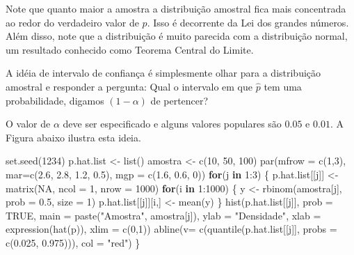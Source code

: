\documentclass[
  10pt,
  a4paper]{book}
\newenvironment{Shaded}{\begin{snugshade}}{\end{snugshade}}
\newcommand{\AttributeTok}[1]{\textcolor[rgb]{0.77,0.63,0.00}{#1}}
\newcommand{\ConstantTok}[1]{\textcolor[rgb]{0.00,0.00,0.00}{#1}}
\newcommand{\ControlFlowTok}[1]{\textcolor[rgb]{0.13,0.29,0.53}{\textbf{#1}}}
\newcommand{\DecValTok}[1]{\textcolor[rgb]{0.00,0.00,0.81}{#1}}
\newcommand{\FloatTok}[1]{\textcolor[rgb]{0.00,0.00,0.81}{#1}}
\newcommand{\FunctionTok}[1]{\textcolor[rgb]{0.00,0.00,0.00}{#1}}
\newcommand{\NormalTok}[1]{#1}
\newcommand{\OtherTok}[1]{\textcolor[rgb]{0.56,0.35,0.01}{#1}}
\newcommand{\SpecialCharTok}[1]{\textcolor[rgb]{0.00,0.00,0.00}{#1}}
\newcommand{\StringTok}[1]{\textcolor[rgb]{0.31,0.60,0.02}{#1}}
\begin{document}
Note que quanto maior a amostra a distribuição amostral fica mais concentrada ao redor do verdadeiro valor de \(p\). Isso é decorrente da Lei dos grandes números. Além disso, note que a distribuição é muito parecida com a distribuição normal, um resultado conhecido como Teorema Central do Limite.

A idéia de intervalo de confiança é simplesmente olhar para a distribuição amostral e responder a pergunta: Qual o intervalo em que \(\hat{p}\) tem uma probabilidade, digamos \((1-\alpha)\) de pertencer?

O valor de \(\alpha\) deve ser especificado e alguns valores populares são \(0.05\) e \(0.01\).
A Figura abaixo ilustra esta ideia.

\begin{Shaded}
\begin{Highlighting}[]
\FunctionTok{set.seed}\NormalTok{(}\DecValTok{1234}\NormalTok{)}
\NormalTok{p.hat.list }\OtherTok{\textless{}{-}} \FunctionTok{list}\NormalTok{()}
\NormalTok{amostra }\OtherTok{\textless{}{-}} \FunctionTok{c}\NormalTok{(}\DecValTok{10}\NormalTok{, }\DecValTok{50}\NormalTok{, }\DecValTok{100}\NormalTok{)}
\FunctionTok{par}\NormalTok{(}\AttributeTok{mfrow =} \FunctionTok{c}\NormalTok{(}\DecValTok{1}\NormalTok{,}\DecValTok{3}\NormalTok{), }\AttributeTok{mar=}\FunctionTok{c}\NormalTok{(}\FloatTok{2.6}\NormalTok{, }\FloatTok{2.8}\NormalTok{, }\FloatTok{1.2}\NormalTok{, }\FloatTok{0.5}\NormalTok{), }\AttributeTok{mgp =} \FunctionTok{c}\NormalTok{(}\FloatTok{1.6}\NormalTok{, }\FloatTok{0.6}\NormalTok{, }\DecValTok{0}\NormalTok{))}
\ControlFlowTok{for}\NormalTok{(j }\ControlFlowTok{in} \DecValTok{1}\SpecialCharTok{:}\DecValTok{3}\NormalTok{) \{}
\NormalTok{  p.hat.list[[j]] }\OtherTok{\textless{}{-}} \FunctionTok{matrix}\NormalTok{(}\ConstantTok{NA}\NormalTok{, }\AttributeTok{ncol =} \DecValTok{1}\NormalTok{, }\AttributeTok{nrow =} \DecValTok{1000}\NormalTok{)}
  \ControlFlowTok{for}\NormalTok{(i }\ControlFlowTok{in} \DecValTok{1}\SpecialCharTok{:}\DecValTok{1000}\NormalTok{) \{}
\NormalTok{  y }\OtherTok{\textless{}{-}} \FunctionTok{rbinom}\NormalTok{(amostra[j], }\AttributeTok{prob =} \FloatTok{0.5}\NormalTok{, }\AttributeTok{size =} \DecValTok{1}\NormalTok{)}
\NormalTok{  p.hat.list[[j]][i,] }\OtherTok{\textless{}{-}} \FunctionTok{mean}\NormalTok{(y)}
\NormalTok{  \}}
\FunctionTok{hist}\NormalTok{(p.hat.list[[j]], }\AttributeTok{prob =} \ConstantTok{TRUE}\NormalTok{, }\AttributeTok{main =} \FunctionTok{paste}\NormalTok{(}\StringTok{"Amostra"}\NormalTok{, amostra[j]), }
     \AttributeTok{ylab =} \StringTok{"Densidade"}\NormalTok{,}
     \AttributeTok{xlab =} \FunctionTok{expression}\NormalTok{(}\FunctionTok{hat}\NormalTok{(p)), }\AttributeTok{xlim =} \FunctionTok{c}\NormalTok{(}\DecValTok{0}\NormalTok{,}\DecValTok{1}\NormalTok{))}
\FunctionTok{abline}\NormalTok{(}\AttributeTok{v=} \FunctionTok{c}\NormalTok{(}\FunctionTok{quantile}\NormalTok{(p.hat.list[[j]], }\AttributeTok{probs =} \FunctionTok{c}\NormalTok{(}\FloatTok{0.025}\NormalTok{, }\FloatTok{0.975}\NormalTok{))), }\AttributeTok{col =} \StringTok{"red"}\NormalTok{)}
\NormalTok{\}}
\end{Highlighting}
\end{Shaded}
\end{document}
